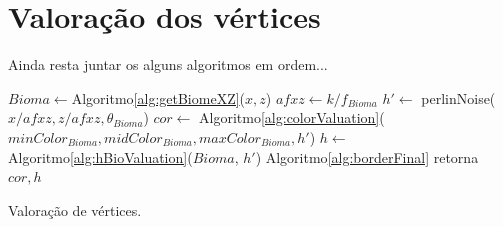 \section{Valoração dos vértices}

Ainda resta juntar os alguns algoritmos em ordem...

\begin{algorithm}[H]\label{alg:vertexValuationm}%
    $Bioma \leftarrow $Algoritmo\ref{alg:getBiomeXZ}($x, z$)\;
    $afxz \leftarrow k/f_{Bioma}$\;
    $h' \leftarrow$ perlinNoise($x/afxz, z/afxz, \theta_{Bioma}$)\;
    $cor \leftarrow$ Algoritmo\ref{alg:colorValuation}($minColor_{Bioma}, midColor_{Bioma}, maxColor_{Bioma}, h'$)\;
    $h \leftarrow$ Algoritmo\ref{alg:hBioValuation}($Bioma$, $h'$)\;
    Algoritmo\ref{alg:borderFinal}\;
    retorna $cor, h$\;
    \caption{Valoração de vértices.}
\end{algorithm}